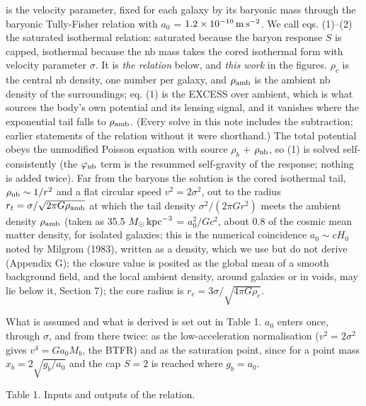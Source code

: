 \documentclass[
  10pt,
]{article}
\begin{document}
is the velocity parameter, fixed for each galaxy by its baryonic mass
through the baryonic Tully-Fisher relation with $a_0$ = $1.2\times10^{-10}\,{\rm m\,s^{-2}}$. We call eqs. (1)--(2) the saturated isothermal relation: saturated because the baryon response $S$ is capped, isothermal because the nb mass takes the cored isothermal form with velocity parameter $\sigma$. It is \emph{the relation} below, and \emph{this work} in the figures.
$\rho_c$ is the central nb density, one number per galaxy, and $\rho_{\rm amb}$ is
the ambient nb density of the surroundings; eq. (1) is the EXCESS over
ambient, which is what sources the body's own potential and its lensing
signal, and it vanishes where the exponential tail falls to $\rho_{\rm amb}$.
(Every solve in this note includes the subtraction; earlier statements
of the relation without it were shorthand.) The total potential obeys the
unmodified Poisson equation with source $\rho_b$ + $\rho_{\rm nb}$, so (1) is
solved self-consistently (the $\varphi_{\rm nb}$ term is the resummed self-gravity
of the response; nothing is added twice). Far from the baryons the
solution is the cored isothermal tail, $\rho_{\rm nb}\sim 1/r^2$ and a flat circular speed $v^2=2\sigma^2$, out to the
radius $r_t=\sigma/\sqrt{2\pi G\rho_{\rm amb}}$ at which the tail density
$\sigma^2/(2\pi G r^2)$ meets the ambient density $\rho_{\rm amb}$ (taken as
35.5 $M_\odot\,{\rm kpc}^{-3}$ = $a_0^2/Gc^2$, about 0.8 of the cosmic mean
matter density, for isolated galaxies; this is the numerical coincidence $a_0\sim cH_0$ noted by Milgrom (1983), written as a density, which we use but do not derive (Appendix G); the closure value is posited as the global mean of a smooth background field,
and the local ambient density, around galaxies or in voids, may lie below
it, Section 7); the
core radius is $r_c=3\sigma/\sqrt{4\pi G\rho_c}$.

What is assumed and what is derived is set out in Table 1. $a_0$ enters
once, through $\sigma$, and from there twice: as the low-acceleration
normalisation ($v^2=2\sigma^2$ gives $v^4=G a_0 M_b$, the BTFR)
and as the saturation point, since for a point mass $x_b=2\sqrt{g_b/a_0}$ and the cap $S=2$ is reached where $g_b=a_0$.

Table 1. Inputs and outputs of the relation.
\end{document}
